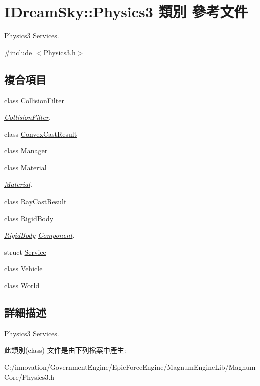 \hypertarget{class_i_dream_sky_1_1_physics3}{}\section{I\+Dream\+Sky\+:\+:Physics3 類別 參考文件}
\label{class_i_dream_sky_1_1_physics3}


\hyperlink{class_i_dream_sky_1_1_physics3}{Physics3} Services.  




{\ttfamily \#include $<$Physics3.\+h$>$}

\subsection*{複合項目}
\begin{DoxyCompactItemize}
\item 
class \hyperlink{class_i_dream_sky_1_1_physics3_1_1_collision_filter}{Collision\+Filter}
\begin{DoxyCompactList}\small\item\em \hyperlink{class_i_dream_sky_1_1_physics3_1_1_collision_filter}{Collision\+Filter}. \end{DoxyCompactList}\item 
class \hyperlink{class_i_dream_sky_1_1_physics3_1_1_convex_cast_result}{Convex\+Cast\+Result}
\item 
class \hyperlink{class_i_dream_sky_1_1_physics3_1_1_manager}{Manager}
\item 
class \hyperlink{class_i_dream_sky_1_1_physics3_1_1_material}{Material}
\begin{DoxyCompactList}\small\item\em \hyperlink{class_i_dream_sky_1_1_physics3_1_1_material}{Material}. \end{DoxyCompactList}\item 
class \hyperlink{class_i_dream_sky_1_1_physics3_1_1_ray_cast_result}{Ray\+Cast\+Result}
\item 
class \hyperlink{class_i_dream_sky_1_1_physics3_1_1_rigid_body}{Rigid\+Body}
\begin{DoxyCompactList}\small\item\em \hyperlink{class_i_dream_sky_1_1_physics3_1_1_rigid_body}{Rigid\+Body} \hyperlink{class_i_dream_sky_1_1_component}{Component}. \end{DoxyCompactList}\item 
struct \hyperlink{struct_i_dream_sky_1_1_physics3_1_1_service}{Service}
\item 
class \hyperlink{class_i_dream_sky_1_1_physics3_1_1_vehicle}{Vehicle}
\item 
class \hyperlink{class_i_dream_sky_1_1_physics3_1_1_world}{World}
\end{DoxyCompactItemize}


\subsection{詳細描述}
\hyperlink{class_i_dream_sky_1_1_physics3}{Physics3} Services. 

此類別(class) 文件是由下列檔案中產生\+:\begin{DoxyCompactItemize}
\item 
C\+:/innovation/\+Government\+Engine/\+Epic\+Force\+Engine/\+Magnum\+Engine\+Lib/\+Magnum\+Core/Physics3.\+h\end{DoxyCompactItemize}
